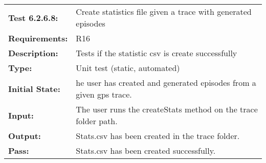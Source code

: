 \documentclass[12pt, titlepage]{article}
\begin{document}
{\begin{tabular}{|l|p{10cm}|}
    \hline
\end{tabular}
\begin{tabular}{|l|p{10cm}|}
    \hline
    \bf{Test} 6.2.6.8: & Create statistics file given a trace with generated episodes \\
    \bf{Requirements}: & R16  \\
    \bf{Description}: & Tests if the statistic csv is create successfully \\
    \bf{Type}: & Unit test (static, automated) \\
    \bf{Initial State}: & he user has created and generated episodes from a given gps trace. \\
    \bf{Input}: & The user runs the createStats method on the trace folder path. \\
    \bf{Output}: & Stats.csv has been created in the trace folder. \\
    \bf{Pass}: & Stats.csv has been created successfully. \\
    \hline
\end{tabular}}
\end{document}
